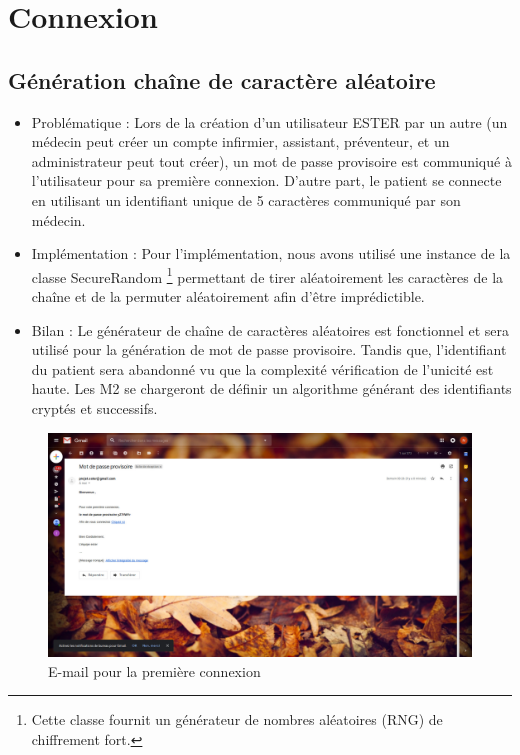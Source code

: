 \section{Connexion}

\subsection{Génération chaîne de caractère aléatoire}
    
\begin{itemize} 
\item Problématique :
Lors de la création d’un utilisateur ESTER par un autre (un médecin peut créer un compte infirmier, assistant, préventeur, et un administrateur peut tout créer), un mot de passe provisoire est communiqué à l’utilisateur  pour sa première connexion.
D’autre part, le patient se connecte en utilisant un identifiant unique de 5 caractères communiqué par son médecin.
\item  Implémentation :
Pour l’implémentation, nous avons utilisé une instance de la classe SecureRandom \footnote{Cette classe fournit un générateur de nombres aléatoires (RNG) de chiffrement fort.} permettant de tirer aléatoirement les caractères de la chaîne et de la permuter aléatoirement afin d’être imprédictible.
\item  Bilan :
Le générateur de chaîne de caractères aléatoires est fonctionnel et sera utilisé pour la génération de mot de passe provisoire. Tandis que, l’identifiant du patient sera abandonné vu que la complexité vérification de l’unicité est haute. Les M2 se chargeront de définir un algorithme générant des identifiants cryptés et successifs.

\end{itemize}

\begin{figure}[H]
    \begin{center}
	\includegraphics[scale=0.25]{img/connexion/mailCo}
    \end{center}
    \caption{E-mail pour la première connexion}
\end{figure}

